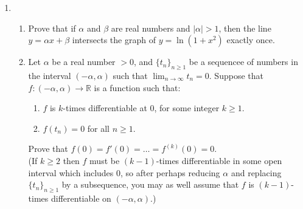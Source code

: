 \documentclass[11pt]{article}
\newcommand{\R}{\mathbb{R}}
\begin{document}
\begin{enumerate}
    \item \begin{enumerate}
        \item Prove that if \(\alpha\) and \(\beta\) are real numbers and \(|\alpha| > 1\), then the line \(y = \alpha x + \beta\) 
          intersects the graph of \(y = \ln(1 + x^2)\) exactly once.

        \item Let \(\alpha\) be a real number \(> 0\), and \(\{t_n\}_{n \geq 1}\) be a sequencee of \underline{}
          numbers in the interval \((-\alpha, \alpha)\) such that \(\displaystyle\lim_{n \to \infty} t_n = 0\).  Suppose that 
          \(f \colon (-\alpha, \alpha) \to \R\) is a function such that:
          \begin{enumerate}[label=(\roman*)]
            \item \(f\) is \(k\)-times differentiable at 0, for some integer \(k \geq 1\).
            \item \(f(t_n) = 0\) for all \(n \geq 1\).
          \end{enumerate}
          Prove that \(f(0) = f'(0) = \hdots = f^{(k)}(0) = 0\). \\
          (If \(k \geq 2\) then \(f\) must be \((k-1)\)-times differentiable in some open interval which includes 0, so after 
          perhaps reducing \(\alpha\) and replacing \(\{t_n\}_{n \geq 1}\) by a subsequence, you may as well assume that \(f\) 
          is \((k-1)\)-times differentiable on \((-\alpha, \alpha)\).)
    \end{enumerate}
\end{enumerate}
\end{document}
